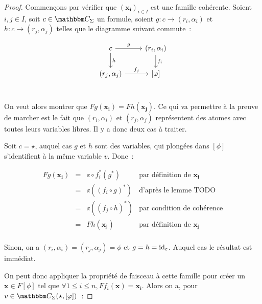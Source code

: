 \begin{proof}
    Commençons par vérifier que $(\mathbf{x_i})_{i\in I}$ est une famille cohérente. Soient
    $i,j\in I$, soit $c\in\C_\Sigma$ un formule, soient
    $g:c\rightarrow (r_i,\alpha_i)$
    et $h:c\rightarrow (r_j,\alpha_j)$ telles que le diagramme suivant commute~:

    \[\begin{tikzcd}
        c \arrow[r, "g"] \arrow[d, "h"] & (r_i,\alpha_i) \arrow[d, "f_i"] \\
          (r_j,\alpha_j) \arrow[r, "f_j"] & \brk{\phi} \\
    \end{tikzcd}\]

    On veut alors montrer que $Fg(\mathbf{x_i}) = Fh(\mathbf{x_j})$. Ce qui va
    permettre à la preuve de marcher est le fait que $(r_i,\alpha_i)$ et
    $(r_j,\alpha_j)$ représentent des atomes avec toutes leurs variables
    libres. Il y a donc deux cas à traiter.

    Soit $c = \star$, auquel cas $g$ et $h$ sont des variables, qui plongées dans 
    $[\phi]$ s'identifient à la même variable $v$. Donc~:
    
    \[\begin{array}{rcll}
        Fg(\mathbf{x_i}) & = & \mathbb{x}\circ f_i^*(g^*)
                             & \text{par définition de } \mathbf{x_i} \\
                         & = & \mathbb{x}((f_i\circ g)^*)
                             & \text{d'après le lemme TODO } \\
                         & = & \mathbb{x}((f_j\circ h)^*)
                             & \text{par condition de cohérence} \\
                         & = & Fh(\mathbf{x_j})
                             & \text{par définition de } \mathbf{x_j} \\
    \end{array}\]

    Sinon, on a $(r_i,\alpha_i) = (r_j,\alpha_j) = \phi$ et $g = h = \operatorname{id}_c$. Auquel cas le
    résultat est immédiat.

    On peut donc appliquer la propriété de faisceau à cette famille pour créer un
    $\mathbf{x}\in F[\phi]$ tel que
    $\forall 1\leq i\leq n, Ff_i(\mathbf{x}) = \mathbf{x_i}$. Alors on a, pour
    $v\in\C_\Sigma(\star,[\phi])$~:


\end{proof}
